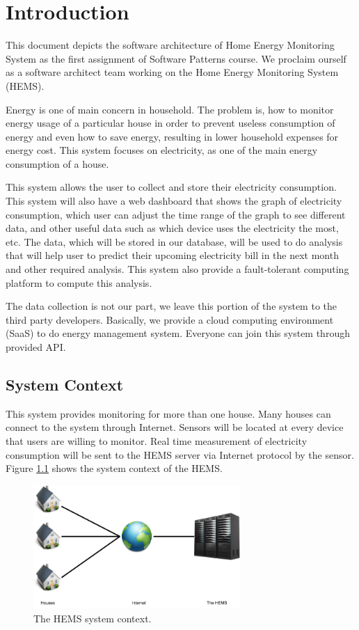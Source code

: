 \chapter{Introduction}
\label{ch:context}
This document depicts the software architecture of Home Energy Monitoring System as the first assignment of Software Patterns course. We proclaim ourself as a software architect team working on the Home Energy Monitoring System (HEMS).

Energy is one of main concern in household. The problem is, how to monitor energy usage of a particular house in order to prevent useless consumption of energy and even how to save energy, resulting in lower household expenses for energy cost. This system focuses on electricity, as one of the main energy consumption of a house.

This system allows the user to collect and store their electricity consumption. This system will also have a web dashboard that shows the graph of electricity consumption, which user can adjust the time range of the graph to see different data, and other useful data such as which device uses the electricity the most, etc. The data, which will be stored in our database, will be used to do analysis that will help user to predict their upcoming electricity bill in the next month and other required analysis. This system also provide a fault-tolerant computing platform to compute this analysis.

The data collection is not our part, we leave this portion of the system to the third party developers. Basically, we provide a cloud computing environment (SaaS) to do energy management system. Everyone can join this system through provided API.

\section{System Context} %
\label{sec:system_context}
This system provides monitoring for more than one house. Many houses can connect to the system through Internet. Sensors will be located at every device that users are willing to monitor. Real time measurement of electricity consumption will be sent to the HEMS server via Internet protocol by the sensor. Figure \ref{fig:system-context} shows the system context of the HEMS.

\begin{figure}[!ht]
	\centering
	\includegraphics[width=0.7\textwidth]{1-context/images/SP-system-context.png}
	\caption{The HEMS system context.}
	\label{fig:system-context}
\end{figure}

